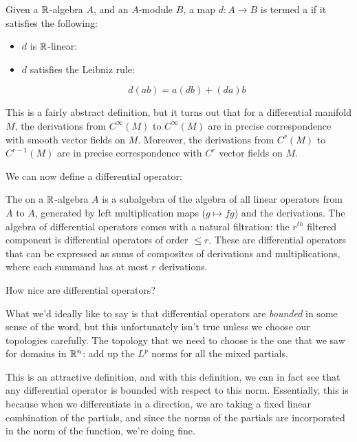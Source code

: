 \documentclass[a4paper]{amsart}
\begin{document}
Given a $\mathbb{R}$-algebra $A$, and an $A$-module $B$, a map $d:A \to B$
is termed a  if it satisfies the following:

\begin{itemize}

\item $d$ is $\mathbb{R}$-linear:

\item $d$ satisfies the Leibniz rule:

  $$d(ab) = a(db) + (da)b$$

\end{itemize}

This is a fairly abstract definition, but it turns out that for a
differential manifold $M$, the derivations from $C^\infty(M)$ to
$C^\infty(M)$ are in precise correspondence with smooth vector fields
on $M$. Moreover, the derivations from $C^r(M)$ to $C^{r-1}(M)$ are in
precise correspondence with $C^r$ vector fields on $M$.

We can now define a differential operator:

\begin{definer}
  The  on a $\mathbb{R}$-algebra
  $A$ is a subalgebra of the algebra of all linear operators from $A$
  to $A$, generated by left multiplication maps ($g \mapsto fg$) and
  the derivations. The algebra of differential operators comes with a
  natural filtration: the $r^{th}$ filtered component is differential
  operators of order $\le r$. These are differential operators that
  can be expressed as sums of composites of derivations and
  multiplications, where each summand has at most $r$ derivations.
\end{definer}

How nice are differential operators?

What we'd ideally like to say is that differential operators are {\em
  bounded} in some sense of the word, but this unfortunately isn't
true unless we choose our topologies carefully. The topology that we
need to choose is the one that we saw for domains in $\mathbb{R}^n$: add up
the $L^p$ norms for all the mixed partials.

This is an attractive definition, and with this definition, we can in
fact see that any differential operator is bounded with respect to
this norm. Essentially, this is because when we differentiate in a
direction, we are taking a fixed linear combination of the partials,
and since the norms of the partials are incorporated in the norm of
the function, we're doing fine.
\end{document}
